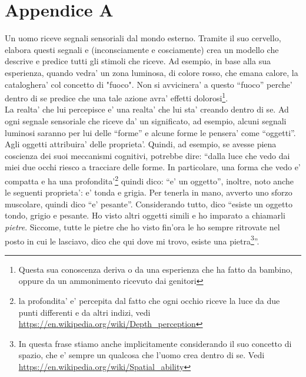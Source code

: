     \begin{poem}

    \end{poem}

\section{Appendice A}
\label{menteCrea}

Un uomo riceve segnali sensoriali dal mondo esterno. Tramite il suo cervello, elabora questi segnali e (inconsciamente e cosciamente) crea un modello che descrive e predice tutti gli stimoli che riceve. Ad esempio, in base alla sua esperienza, quando vedra' un zona luminosa, di colore rosso, che emana calore, la cataloghera' col concetto di "fuoco". Non si avvicinera' a questo ``fuoco'' perche' dentro di se predice che una tale azione avra' effetti dolorosi\footnote{Questa sua conoscenza deriva o da una esperienza che ha fatto da bambino, oppure da un ammonimento ricevuto dai genitori}.\\
La realta' che lui percepisce e' una realta' che lui sta' creando dentro di se. Ad ogni segnale sensoriale che riceve da' un significato, ad esempio, alcuni segnali luminosi saranno per lui delle ``forme'' e alcune forme le pensera' come ``oggetti''. Agli oggetti attribuira' delle proprieta'.  Quindi, ad esempio, se avesse piena coscienza dei suoi meccanismi cognitivi, potrebbe dire: ``dalla luce che vedo dai miei due occhi riesco a tracciare delle forme. In particolare, una forma che vedo e' compatta e ha una profondita'\footnote{la profondita' e' percepita dal fatto che ogni occhio riceve la luce da due punti differenti e da altri indizi, vedi \url{https://en.wikipedia.org/wiki/Depth\_perception}} quindi dico: ``e' un oggetto'', inoltre, noto anche le seguenti proprieta': e' tonda e grigia. Per tenerla in mano, avverto uno sforzo muscolare, quindi dico ``e' pesante''. Considerando tutto, dico ``esiste un oggetto tondo, grigio e pesante. Ho visto altri oggetti simili e ho imparato a chiamarli \emph{pietre}. Siccome, tutte le pietre che ho visto fin'ora le ho sempre ritrovate nel posto in cui le lasciavo, dico che qui dove mi trovo, esiste una pietra\footnote{In questa frase stiamo anche implicitamente considerando il suo concetto di spazio, che e' sempre un qualcosa che l'uomo crea dentro di se. Vedi \url{https://en.wikipedia.org/wiki/Spatial\_ability}}''.\\




